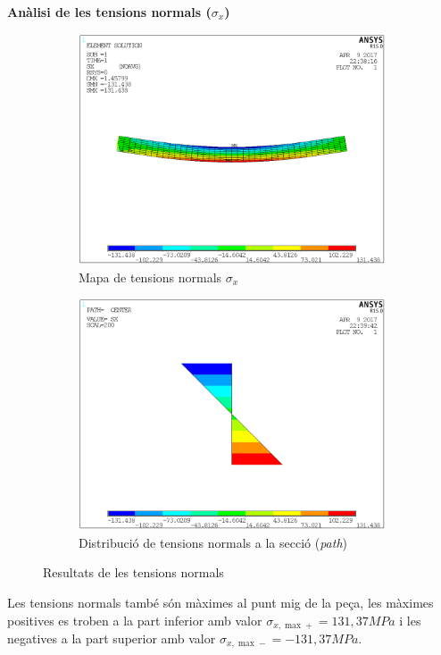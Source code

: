\documentclass[a4paper]{article}
\def\imgS{0.42\textwidth}
\begin{document}
\textbf{Anàlisi de les tensions normals ($\sigma_x$)}
\begin{figure}[H]
	\begin{subfigure}{\imgS}
		\includegraphics[width=\textwidth]{images/400_stress}
		\caption{Mapa de tensions normals {$\sigma_x$}}
		\label{fig:400_stress}
	\end{subfigure}
	\hfill
	\begin{subfigure}{\imgS}
		\includegraphics[width=\textwidth]{images/400_stress_path}
		\caption{Distribució de tensions normals a la secció (\emph{path})}
		\label{fig:400_stress_path}
	\end{subfigure}
	\caption{Resultats de les tensions normals}
	\label{fig:400_stress_results}
\end{figure}
Les tensions normals també són màximes al punt mig de la peça, les màximes positives es troben a la part inferior amb valor $\sigma_{x,\max+} = 131,37 MPa$ i les negatives a la part superior amb valor $\sigma_{x,\max-} = -131,37 MPa$. 
\end{document}
